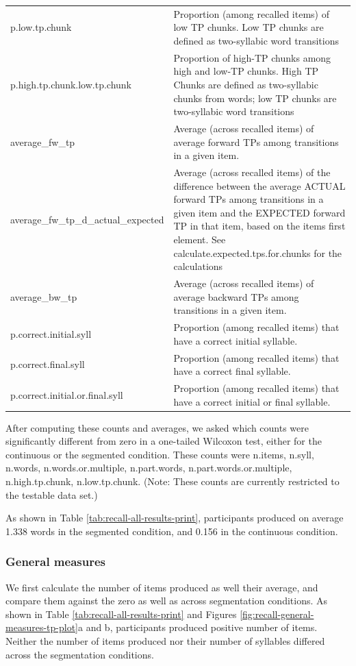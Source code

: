 \documentclass[]{article}
\begin{document}
\begin{table}[!h]
{\begin{tabular}[t]{l>{\raggedright\arraybackslash}p{30em}}
\addlinespace
p.low.tp.chunk & Proportion (among recalled items) of low TP chunks. Low TP chunks are defined as two-syllabic word transitions\\
p.high.tp.chunk.low.tp.chunk & Proportion of high-TP chunks among high and low-TP chunks. High TP Chunks are defined as two-syllabic chunks from words; low TP chunks are two-syllabic word transitions\\
average\_fw\_tp & Average (across recalled items) of average forward TPs among transitions in a given item.\\
average\_fw\_tp\_d\_actual\_expected & Average (across recalled items) of the difference between the average ACTUAL forward TPs among transitions in a given item and the EXPECTED forward TP in that item, based on the items first element. See calculate.expected.tps.for.chunks for the calculations\\
average\_bw\_tp & Average (across recalled items) of average backward TPs among transitions in a given item.\\
\addlinespace
p.correct.initial.syll & Proportion (among recalled items) that have a correct initial syllable.\\
p.correct.final.syll & Proportion (among recalled items) that have a correct final syllable.\\
p.correct.initial.or.final.syll & Proportion (among recalled items) that have a correct initial or final syllable.\\
\bottomrule
\end{tabular}}
\end{table}

After computing these counts and averages, we asked which counts were
significantly different from zero in a one-tailed Wilcoxon test, either
for the continuous or the segmented condition. These counts were
n.items, n.syll, n.words, n.words.or.multiple, n.part.words,
n.part.words.or.multiple, n.high.tp.chunk, n.low.tp.chunk. (Note: These
counts are currently restricted to the testable data set.)

As shown in Table \ref{tab:recall-all-results-print}, participants
produced on average 1.338 words in the segmented condition, and 0.156 in
the continuous condition.

\subsubsection{General measures}\label{general-measures}

We first calculate the number of items produced as well their average,
and compare them against the zero as well as across segmentation
conditions. As shown in Table \ref{tab:recall-all-results-print} and
Figures \ref{fig:recall-general-measures-tp-plot}a and b, participants
produced positive number of items. Neither the number of items produced
nor their number of syllables differed across the segmentation
conditions.
\end{document}
